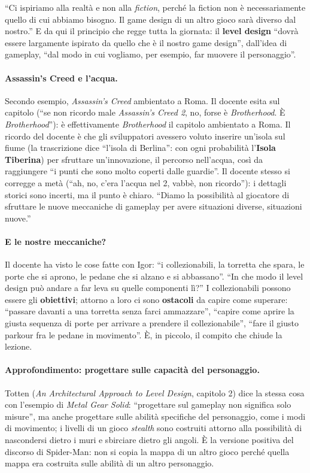 ``Ci ispiriamo alla realtà e non alla \emph{fiction}, perché la fiction non è
necessariamente quello di cui abbiamo bisogno. Il game design di un altro gioco sarà
diverso dal nostro.'' E da qui il principio che regge tutta la giornata: il \textbf{level
design} ``dovrà essere largamente ispirato da quello che è il nostro game design'', dall'idea
di gameplay, ``dal modo in cui vogliamo, per esempio, far muovere il personaggio''.

\paragraph{Assassin's Creed e l'acqua.} Secondo esempio, \emph{Assassin's Creed}
ambientato a Roma. Il docente esita sul capitolo (``se non ricordo male \emph{Assassin's
Creed 2}, no, forse è \emph{Brotherhood}. È \emph{Brotherhood}''): è effettivamente
\emph{Brotherhood} il capitolo ambientato a Roma. Il ricordo del docente è che gli
sviluppatori avessero voluto inserire un'isola sul fiume (la trascrizione dice ``l'isola di
Berlina'': con ogni probabilità l'\textbf{Isola Tiberina}) per sfruttare un'innovazione,
il percorso nell'acqua, così da raggiungere ``i punti che sono molto coperti dalle
guardie''. Il docente stesso si corregge a metà (``ah, no, c'era l'acqua nel 2, vabbè, non
ricordo''): i dettagli storici sono incerti, ma il punto è chiaro. ``Diamo la possibilità
al giocatore di sfruttare le nuove meccaniche di gameplay per avere situazioni diverse,
situazioni nuove.''

\paragraph{E le nostre meccaniche?} Il docente ha visto le cose fatte con Igor: ``i
collezionabili, la torretta che spara, le porte che si aprono, le pedane che si alzano e si
abbassano''. ``In che modo il level design può andare a far leva su quelle componenti
lì?'' I collezionabili possono essere gli \textbf{obiettivi}; attorno a loro ci sono
\textbf{ostacoli} da capire come superare: ``passare davanti a una torretta senza farci
ammazzare'', ``capire come aprire la giusta sequenza di porte per arrivare a prendere il
collezionabile'', ``fare il giusto parkour fra le pedane in movimento''. È, in piccolo,
il compito che chiude la lezione.

\paragraph{Approfondimento: progettare sulle capacità del personaggio.} Totten
(\emph{An Architectural Approach to Level Design}, capitolo 2) dice la stessa cosa con
l'esempio di \emph{Metal Gear Solid}: ``progettare sul gameplay non significa solo
misure'', ma anche progettare sulle abilità specifiche del personaggio, come i modi di
movimento; i livelli di un gioco \emph{stealth} sono costruiti attorno alla possibilità di
nascondersi dietro i muri e sbirciare dietro gli angoli. È la versione positiva del
discorso di Spider-Man: non si copia la mappa di un altro gioco perché quella mappa era
costruita sulle abilità di un altro personaggio.

